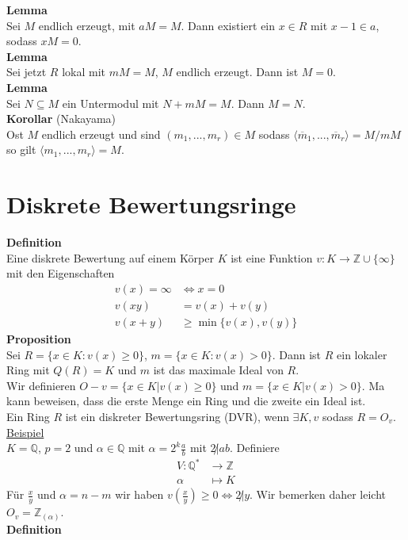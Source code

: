 \documentclass[a4paper, 12pt]{article}
\begin{document}
\textbf{Lemma}\\
Sei $M$ endlich erzeugt, mit $aM = M$. Dann existiert ein $x \in R$ mit $x-1 \in a$, sodass $xM = 0$.\\
\textbf{Lemma}\\
Sei jetzt $R$ lokal mit $mM = M$, $M$ endlich erzeugt. Dann ist $M=0$.\\
\textbf{Lemma}\\
Sei $N \subseteq M$ ein Untermodul mit $N+mM = M$. Dann $M=N$.\\
\textbf{Korollar} (Nakayama)\\
Ost $M$ endlich erzeugt und sind $(m_1,...,m_r) \in M$ sodass $\langle\overline{m}_1,...,\overline{m}_r\rangle = M/mM$ so gilt $\langle m_1,...,m_r\rangle = M$.
\section{Diskrete Bewertungsringe}
\textbf{Definition}\\
Eine diskrete Bewertung auf einem Körper $K$ ist eine Funktion $v: K \to \mathbb{Z}\cup \{\infty\}$ mit den Eigenschaften \begin{align*}
	v(x) = \infty & \Leftrightarrow x = 0\\
	v(xy) &= v(x)+v(y)\\
	v(x+y) & \geq \min\{v(x),v(y)\}
\end{align*}
\textbf{Proposition}\\
Sei $R = \{x \in K: v(x) \geq 0\}$, $m = \{x \in K: v(x) > 0\}$. Dann ist $R$ ein lokaler Ring mit $Q(R) = K$ und $m$ ist das maximale Ideal von $R$.\\
Wir definieren $O-v = \{x \in K | v(x) \geq 0\}$ und $m = \{x \in K | v(x) > 0\}$. Ma kann beweisen, dass die erste Menge ein Ring und die zweite ein Ideal ist.\\
Ein Ring $R$ ist ein diskreter Bewertungsring (DVR), wenn $\exists K,v$ sodass $R = O_v$.\\
\underline{Beispiel}\\
$K = \mathbb{Q}$, $p = 2$ und $\alpha \in \mathbb{Q}$ mit $\alpha = 2^k\frac{a}{b}$ mit $2\not | ab$. Definiere \begin{align*}
	V: \mathbb{Q}^* &\to \mathbb{Z}\\
	\alpha &\mapsto K
\end{align*}
Für $\frac{x}{y}$ und $\alpha = n-m$ wir haben $v(\frac{x}{y}) \geq 0 \iff 2 \not |y$. Wir bemerken daher leicht $O_v = \mathbb{Z}_{(\alpha)}$.\\
\textbf{Definition}\\
\end{document}
